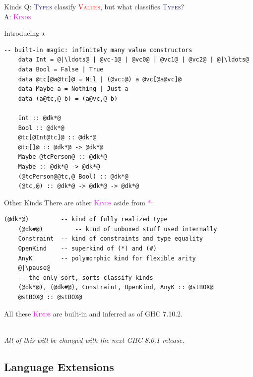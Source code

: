 \documentclass[xcolor={usenames,dvipsnames}]{beamer}
\newcommand{\htycon}[1]{\textcolor{MidnightBlue}{\textsc{#1}}}
\newcommand{\hvalcon}[1]{\textcolor{Red}{\textsc{#1}}}
\newcommand{\hkind}[1]{\textcolor{Fuchsia}{\textsc{#1}}}
\begin{document}
\begin{frame}[fragile]{Kinds}
  Q: \htycon{Types} classify \hvalcon{Values}, but what classifies \htycon{Types}?\\
  A: \hkind{Kinds}
\end{frame}

\begin{frame}[fragile]{Introducing $\star$}
  \begin{lstlisting}[style=hask]
    -- built-in magic: infinitely many value constructors
    data Int = @|\ldots@ | @vc-1@ | @vc0@ | @vc1@ | @vc2@ | @|\ldots@
    data Bool = False | True
    data @tc[@a@tc]@ = Nil | (@vc:@) a @vc[@a@vc]@
    data Maybe a = Nothing | Just a
    data (a@tc,@ b) = (a@vc,@ b)

    Int :: @dk*@
    Bool :: @dk*@
    @tc[@Int@tc]@ :: @dk*@
    @tc[]@ :: @dk*@ -> @dk*@
    Maybe @tcPerson@ :: @dk*@
    Maybe :: @dk*@ -> @dk*@
    (@tcPerson@@tc,@ Bool) :: @dk*@
    (@tc,@) :: @dk*@ -> @dk*@ -> @dk*@
  \end{lstlisting}
\end{frame}

\begin{frame}[fragile]{Other Kinds}
  There are other \hkind{Kinds} aside from \hkind{*}:
  \begin{lstlisting}[style=hask]
    (@dk*@)         -- kind of fully realized type
    (@dk#@)         -- kind of unboxed stuff used internally
    Constraint  -- kind of constraints and type equality
    OpenKind    -- superkind of (*) and (#)
    AnyK        -- polymorphic kind for flexible arity
    @|\pause@
    -- the only sort, sorts classify kinds
    (@dk*@), (@dk#@), Constraint, OpenKind, AnyK :: @stBOX@
    @stBOX@ :: @stBOX@
  \end{lstlisting}

  All these \hkind{Kinds} are built-in and inferred as of GHC 7.10.2.
  
  \ \\
  \textit{\tiny{All of this will be changed with the next GHC 8.0.1 release.}}
\end{frame}


\subsection{Language Extensions}
\end{document}

